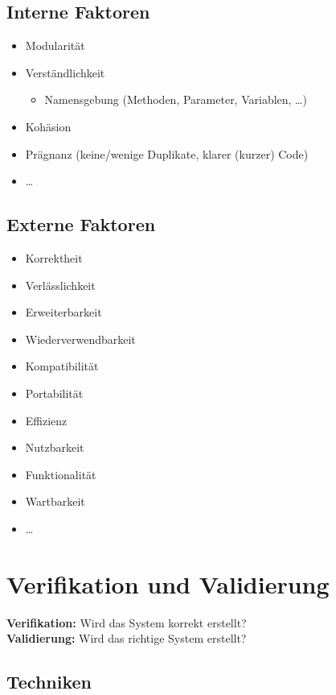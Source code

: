 \documentclass[a4paper, 11pt, accentcolor = tud3b]{tudreport}
\begin{document}
			\subsection{Interne Faktoren}
				\begin{itemize}
					\item Modularität
					\item Verständlichkeit
						\begin{itemize}
							\item Namensgebung (Methoden, Parameter, Variablen, \dots)
						\end{itemize}
					\item Kohäsion
					\item Prägnanz (keine/wenige Duplikate, klarer (kurzer) Code)
					\item \dots
				\end{itemize}
			
			\subsection{Externe Faktoren}
				\begin{itemize}
					\item Korrektheit
					\item Verlässlichkeit
					\item Erweiterbarkeit
					\item Wiederverwendbarkeit
					\item Kompatibilität
					\item Portabilität
					\item Effizienz
					\item Nutzbarkeit
					\item Funktionalität
					\item Wartbarkeit
					\item \dots
				\end{itemize}
		
		\section{Verifikation und Validierung}
			\textbf{Verifikation:} Wird das System korrekt erstellt? \\
			\textbf{Validierung:} Wird das richtige System erstellt?
			
			\subsection{Techniken}
\end{document}
